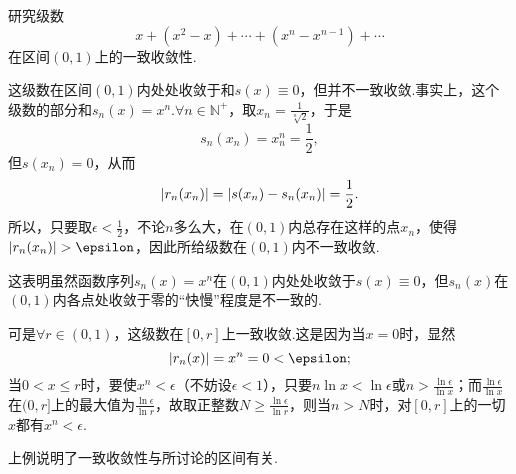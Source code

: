 \begin{example}
研究级数\[
x + (x^2-x) + \dotsb + (x^n-x^{n-1}) + \dotsb
\]在区间\((0,1)\)上的一致收敛性.
\begin{solution}
这级数在区间\((0,1)\)内处处收敛于和\(s(x)\equiv0\)，但并不一致收敛.事实上，这个级数的部分和\(s_n(x) = x^n\).\(\forall n\in\mathbb{N}^+\)，取\(x_n = \frac{1}{\sqrt[n]{2}}\)，于是\[
s_n(x_n) = x_n^n = \frac{1}{2},
\]但\(s(x_n) = 0\)，从而\[
\abs{r_n(x_n)} = \abs{s(x_n) - s_n(x_n)} = \frac{1}{2}.
\]所以，只要取\(\epsilon<\frac{1}{2}\)，不论\(n\)多么大，在\((0,1)\)内总存在这样的点\(x_n\)，使得\(\abs{r_n(x_n)}>\epsilon\)，因此所给级数在\((0,1)\)内不一致收敛.

这表明虽然函数序列\(s_n(x) = x^n\)在\((0,1)\)内处处收敛于\(s(x)\equiv0\)，但\(s_n(x)\)在\((0,1)\)内各点处收敛于零的“快慢”程度是不一致的.

可是\(\forall r\in(0,1)\)，这级数在\([0,r]\)上一致收敛.这是因为当\(x=0\)时，显然\[
\abs{r_n(x)} = x^n = 0 < \epsilon;
\]当\(0 < x \leq r\)时，要使\(x^n < \epsilon\)（不妨设\(\epsilon < 1\)），只要\(n \ln x < \ln\epsilon\)或\(n > \frac{\ln\epsilon}{\ln x}\)；而\(\frac{\ln\epsilon}{\ln x}\)在\((0,r]\)上的最大值为\(\frac{\ln\epsilon}{\ln r}\)，故取正整数\(N \geq \frac{\ln\epsilon}{\ln r}\)，则当\(n > N\)时，对\([0,r]\)上的一切\(x\)都有\(x^n < \epsilon\).
\end{solution}
\end{example}
上例说明了一致收敛性与所讨论的区间有关.

